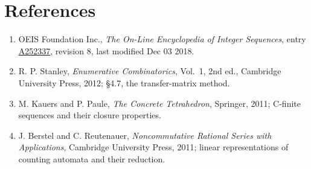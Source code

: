 \documentclass[11pt]{article}
\theoremstyle{definition}
\begin{document}
\section{References}

\begin{enumerate}

\item OEIS Foundation Inc., \emph{The On-Line Encyclopedia of Integer Sequences}, entry \href{https://oeis.org/A252337}{A252337}, revision 8, last modified Dec 03 2018.

\item R. P. Stanley, \emph{Enumerative Combinatorics}, Vol.~1, 2nd ed., Cambridge University Press, 2012; \S4.7, the transfer-matrix method.

\item M. Kauers and P. Paule, \emph{The Concrete Tetrahedron}, Springer, 2011; C-finite sequences and their closure properties.

\item J. Berstel and C. Reutenauer, \emph{Noncommutative Rational Series with Applications}, Cambridge University Press, 2011; linear representations of counting automata and their reduction.

\end{enumerate}
\end{document}
